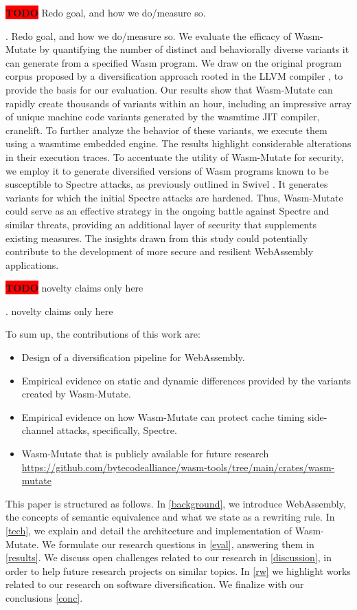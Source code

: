 \documentclass[sigplan,screen]{acmart}
\newcommand*\badge[1]{ \colorbox{red}{\color{white}#1}}
\newcommand{\tool}{{\sc Wasm-Mutate}\xspace}
\newcommand{\wasm}{Wasm\xspace}
\newcommand{\Wasm}{WebAssembly\xspace}
\newcommand{\repourl}{\url{https://github.com/bytecodealliance/wasm-tools/tree/main/crates/wasm-mutate}}
\newcommand{\todo}[1]{%
\refstepcounter{todo}
\noindent\textbf{\badge{TODO}} {\color{red}#1}
\addcontentsline{td}{todo}
{\color{red}\thesection.\thetodo\xspace #1}}
\begin{document}
\todo{Redo goal, and how we do/measure so.}
We evaluate the efficacy of \tool by quantifying the number of distinct and behaviorally diverse variants it can generate from a specified \wasm program. 
We draw on the original program corpus proposed by a diversification approach rooted in the LLVM compiler \cite{arteaga2020crow}, to provide the basis for our evaluation.
Our results show that \tool can rapidly create thousands of variants within an hour, including an impressive array of unique machine code variants generated by the wasmtime JIT compiler, cranelift. 
To further analyze the behavior of these variants, we execute them using a wasmtime embedded engine. 
The results highlight considerable alterations in their execution traces.
To accentuate the utility of \tool for security, we employ it to generate diversified versions of \wasm programs known to be susceptible to Spectre attacks, as previously outlined in Swivel \cite{Swivel}. 
It generates variants for which the initial Spectre attacks are hardened.
Thus, \tool could serve as an effective strategy in the ongoing battle against Spectre and similar threats, providing an additional layer of security that supplements existing measures. 
The insights drawn from this study could potentially contribute to the development of more secure and resilient \Wasm applications.


\todo{novelty claims only here}

To sum up, the contributions of this work are:

\begin{itemize}
    \item Design of a diversification pipeline for WebAssembly.
    \item Empirical evidence on static and dynamic differences provided by the variants created by \tool.
    \item Empirical evidence on how \tool can protect cache timing side-channel attacks, specifically, Spectre.
    \item \tool that is publicly available for future research \repourl    
\end{itemize}

This paper is structured as follows. 
In \autoref{background}, we introduce WebAssembly, the concepts of semantic equivalence and what we state as a rewriting rule.
In \autoref{tech}, we explain and detail the architecture and implementation of \tool.
We formulate our research questions in \autoref{eval}, answering them in \autoref{results}.
We discuss open challenges related to our research in \autoref{discussion}, in order to help future research projects on similar topics.
In \autoref{rw} we highlight works related to our research on software diversification.
We finalize with our conclusions \autoref{conc}.
\end{document}
